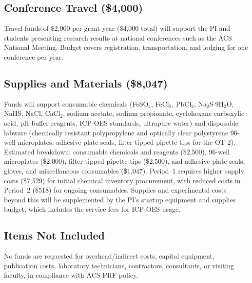 \documentclass[12pt]{article}
\begin{document}
\subsection*{Conference Travel (\$4,000)}

Travel funds of \$2,000 per grant year (\$4,000 total) will support the PI and students presenting research results at national conferences such as the ACS National Meeting. Budget covers registration, transportation, and lodging for one conference per year.

\subsection*{Supplies and Materials (\$8,047)}

Funds will support consumable chemicals (FeSO$_4$, FeCl$_2$, PbCl$_2$, Na$_2$S$\cdot$9H$_2$O, NaHS, NaCl, CaCl$_2$, sodium acetate, sodium propionate, cyclohexane carboxylic acid, pH buffer reagents, ICP-OES standards, ultrapure water) and disposable labware (chemically resistant polypropylene and optically clear polystyrene 96-well microplates, adhesive plate seals, filter-tipped pipette tips for the OT-2). Estimated breakdown: consumable chemicals and reagents (\$2,500), 96-well microplates (\$2,000), filter-tipped pipette tips (\$2,500), and adhesive plate seals, gloves, and miscellaneous consumables (\$1,047). Period~1 requires higher supply costs (\$7,529) for initial chemical inventory procurement, with reduced costs in Period~2 (\$518) for ongoing consumables. Supplies and experimental costs beyond this will be supplemented by the PI's startup equipment and supplies budget, which includes the service fees for ICP-OES usage.

\subsection*{Items Not Included}

No funds are requested for overhead/indirect costs, capital equipment, publication costs, laboratory technicians, contractors, consultants, or visiting faculty, in compliance with ACS PRF policy.
\end{document}
